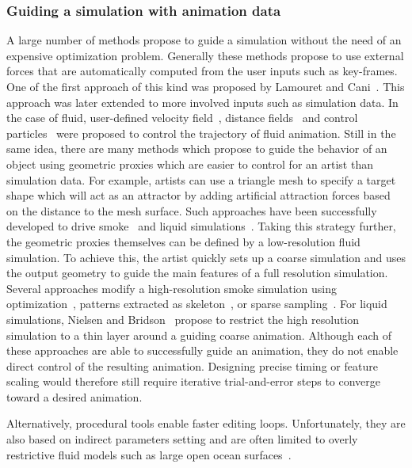 \subsubsection{Guiding a simulation with animation data}
A large number of methods propose to guide a simulation without the need of an expensive optimization problem. 
Generally these methods propose to use external forces that are automatically computed from the user inputs such as key-frames.
One of the first approach of this kind was proposed by Lamouret and Cani~\cite{Lamouret1996}.
This approach was later extended to more involved inputs such as simulation data.
In the case of fluid, user-defined velocity field~\cite{Kim2006:SmokeControl}, distance fields~\cite{Yang2013} and control particles~\cite{Thurey2006:FluidControl,Madill2013} were proposed to control the trajectory of fluid animation.
Still in the same idea, there are many methods which propose to guide the behavior of an object using geometric proxies which are easier to control for an artist than simulation data. For example, artists can use a triangle mesh to specify a target shape which will act as an attractor by adding artificial attraction forces based on the distance to the mesh surface. 
Such approaches have been successfully developed to drive smoke~\cite{Fattal2004,Hong2004,Shi2005a} and liquid simulations~\cite{Shi2005b,Raveendran2012}.
Taking this strategy further, the geometric proxies themselves can be defined by a low-resolution fluid simulation. 
To achieve this, the artist quickly sets up a coarse simulation and uses the output geometry to guide the main features of a full resolution simulation.
Several approaches modify a high-resolution smoke simulation using optimization~\cite{Nielsen2009,Nielsen2010}, patterns extracted as skeleton~\cite{Yuan2011}, or sparse sampling~\cite{Huang2013}.
For liquid simulations, Nielsen and Bridson~\cite{Nielsen2011} propose to restrict the high resolution simulation to a thin layer around a guiding coarse animation.
Although each of these approaches are able to successfully guide an animation, they do not enable direct control of the resulting animation. Designing precise timing or feature scaling would therefore still require iterative trial-and-error steps to converge toward a desired animation.

Alternatively, procedural tools enable faster editing loops.
Unfortunately, they are also based on indirect parameters setting and are often limited to overly restrictive fluid models such as large open ocean surfaces~\cite{hinsinger2002,Tessendorf2004,jeschke2015water,horvath2015empirical}.

